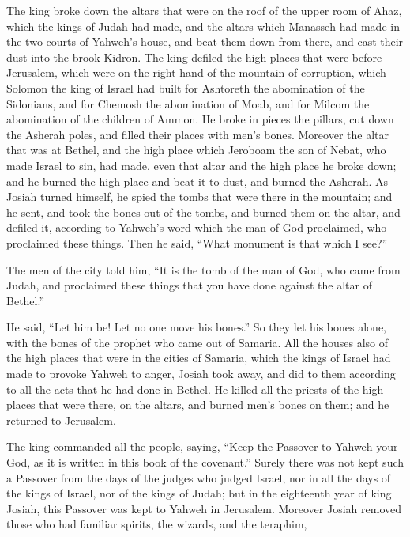 {The king broke down the altars that were on the roof of the upper room of Ahaz, which the kings of Judah had made, and the altars which Manasseh had made in the two courts of Yahweh’s house, and beat them down from there, and cast their dust into the brook Kidron.
The king defiled the high places that were before Jerusalem, which were on the right hand of the mountain of corruption, which Solomon the king of Israel had built for Ashtoreth the abomination of the Sidonians, and for Chemosh the abomination of Moab, and for Milcom the abomination of the children of Ammon.
He broke in pieces the pillars, cut down the Asherah poles, and filled their places with men’s bones.
Moreover the altar that was at Bethel, and the high place which Jeroboam the son of Nebat, who made Israel to sin, had made, even that altar and the high place he broke down; and he burned the high place and beat it to dust, and burned the Asherah.
As Josiah turned himself, he spied the tombs that were there in the mountain; and he sent, and took the bones out of the tombs, and burned them on the altar, and defiled it, according to Yahweh’s word which the man of God proclaimed, who proclaimed these things.
Then he said, “What monument is that which I see?”
\par }{\PP The men of the city told him, “It is the tomb of the man of God, who came from Judah, and proclaimed these things that you have done against the altar of Bethel.”
\par }{\PP {}He said, “Let him be! Let no one move his bones.” So they let his bones alone, with the bones of the prophet who came out of Samaria.
All the houses also of the high places that were in the cities of Samaria, which the kings of Israel had made to provoke Yahweh to anger, Josiah took away, and did to them according to all the acts that he had done in Bethel.
He killed all the priests of the high places that were there, on the altars, and burned men’s bones on them; and he returned to Jerusalem.
\par }{\PP {}The king commanded all the people, saying, “Keep the Passover to Yahweh your God, as it is written in this book of the covenant.”
Surely there was not kept such a Passover from the days of the judges who judged Israel, nor in all the days of the kings of Israel, nor of the kings of Judah;
but in the eighteenth year of king Josiah, this Passover was kept to Yahweh in Jerusalem.
Moreover Josiah removed those who had familiar spirits, the wizards, and the teraphim,}
